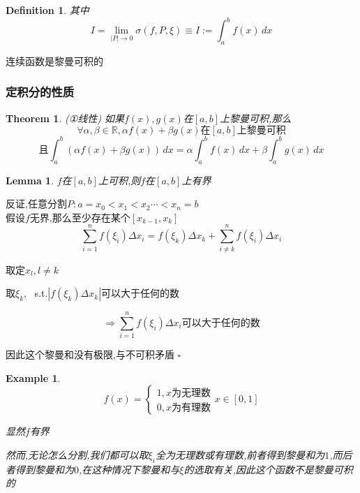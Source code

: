 \documentclass[11pt,hyperref,a4paper,UTF8]{ctexart}
\newtheorem{theorem}{Theorem}[subsection]
\newtheorem{lemma}{Lemma}[subsection]
\newtheorem{example}{Example}[subsection]
\newtheorem{definition}{Definition}[subsection]
\newenvironment{cproof}{%
\heiti{证明}\kaishu
}{%
  \hfill $\square$
  \par\bigskip
}
\newcommand{\RR}{\mathbb{R}}
\begin{document}
\begin{CJK}{UTF8}{gkai}
\begin{definition}
  其中
  \[I = \lim_{|P|\to 0} \sigma(f,P,\xi) \equiv I := \int_{a}^{b}f(x)\,dx\]
\end{definition}

连续函数是黎曼可积的\\

\subsubsection{定积分的性质}

\begin{theorem}(①线性)
如果$f(x),g(x)$在$[a,b]$上黎曼可积,那么
\[\forall \alpha,\beta\in \RR , \alpha f(x) + \beta g(x)\text{在}[a,b]\text{上黎曼可积}\]
\[\text{且} \int_{a}^{b} (\alpha f(x) + \beta g(x))\,dx = \alpha \int_{a}^{b}f(x)\,dx + \beta \int_{a}^{b}g(x)\,dx\]
\end{theorem}

\begin{lemma}
  $f$在$[a,b]$上可积,则$f$在$[a,b]$上有界\\
\end{lemma}

\begin{cproof}
  反证,任意分割$P: a = x_0< x_1 <x_2\cdots < x_n = b$\\
  假设$f$无界,那么至少存在某个$[x_{k-1},x_k]$
  \[\sum_{i = 1}^n f(\xi_i)\Delta x_i  = f(\xi_k)\Delta x_k+\sum_{i \neq k}^n f(\xi_i)\Delta x_i \]

  取定$x_l,l\neq k$

  取$\xi_k$,~ s.t.$| f(\xi_k)\Delta x_k|$可以大于任何的数

  \[\Rightarrow \sum_{i = 1}^n f(\xi_i)\Delta x_i\text{可以大于任何的数}\]

  因此这个黎曼和没有极限,与不可积矛盾
\end{cproof}

\begin{example}
  \begin{equation*}
    f(x)=
    \begin{cases}
      1,x\text{为无理数}\\
      0,x\text{为有理数}
    \end{cases}
    x\in[0,1]
  \end{equation*}

显然$f$有界

然而,无论怎么分割,我们都可以取$\xi_i$全为无理数或有理数,前者得到黎曼和为$1$,而后者得到黎曼和为$0$,在这种情况下黎曼和与$\xi$的选取有关,因此这个函数不是黎曼可积的\\
\end{example}


\end{CJK}
\end{document}
